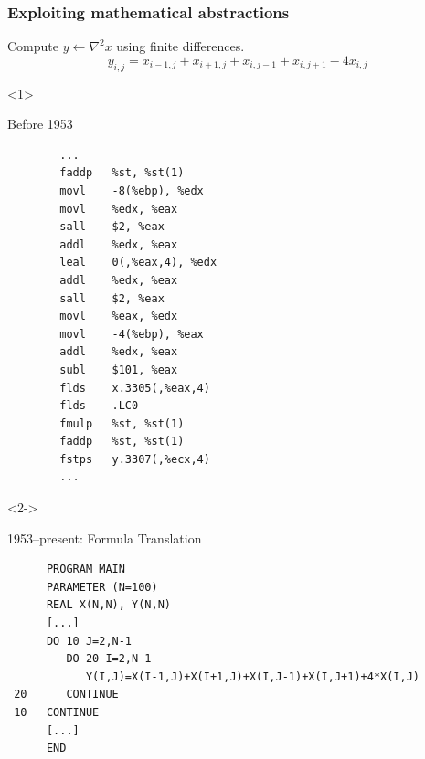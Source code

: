 \documentclass[presentation]{beamer}
\begin{document}
\begin{frame}[fragile]
  \frametitle{Exploiting mathematical abstractions}
  Compute $y \leftarrow \nabla^2 x$ using finite differences.
  \begin{equation*}
    y_{i,j} = x_{i-1, j} + x_{i+1, j} + x_{i, j-1} + x_{i, j+1} - 4x_{i,j}    
  \end{equation*}
  \begin{overlayarea}{\textwidth}{0.8\textheight}
  \begin{onlyenv}<1>
    \begin{block}{Before 1953}
\begin{verbatim}
        ...
        faddp   %st, %st(1)
        movl    -8(%ebp), %edx
        movl    %edx, %eax
        sall    $2, %eax
        addl    %edx, %eax
        leal    0(,%eax,4), %edx
        addl    %edx, %eax
        sall    $2, %eax
        movl    %eax, %edx
        movl    -4(%ebp), %eax
        addl    %edx, %eax
        subl    $101, %eax
        flds    x.3305(,%eax,4)
        flds    .LC0
        fmulp   %st, %st(1)
        faddp   %st, %st(1)
        fstps   y.3307(,%ecx,4)
        ...
\end{verbatim}
    \end{block}
  \end{onlyenv}
  \begin{onlyenv}<2->
    \begin{block}{1953--present: Formula Translation}
\begin{verbatim}
      PROGRAM MAIN
      PARAMETER (N=100)
      REAL X(N,N), Y(N,N)
      [...]
      DO 10 J=2,N-1
         DO 20 I=2,N-1
            Y(I,J)=X(I-1,J)+X(I+1,J)+X(I,J-1)+X(I,J+1)+4*X(I,J)
 20      CONTINUE
 10   CONTINUE
      [...]
      END
\end{verbatim}
    \end{block}
  \end{onlyenv}
  \end{overlayarea}
\end{frame}
\end{document}
